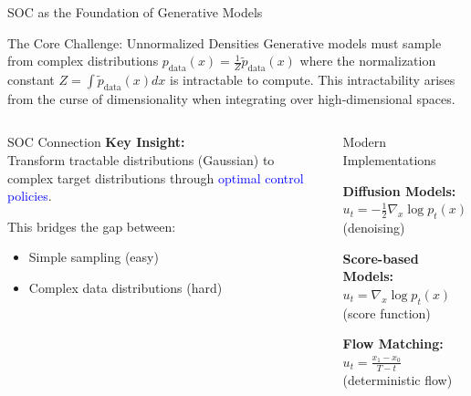 \documentclass[aspectratio=169,xcolor=dvipsnames]{beamer}
\begin{document}
\begin{frame}{SOC as the Foundation of Generative Models}
    \vspace{-0.3cm}
    \begin{block}{The Core Challenge: Unnormalized Densities}
        Generative models must sample from complex distributions $p_{\text{data}}(x) = \frac{1}{Z} \tilde{p}_{\text{data}}(x)$ where the normalization constant $Z = \int \tilde{p}_{\text{data}}(x) dx$ is intractable to compute. This intractability arises from the curse of dimensionality when integrating over high-dimensional spaces.
    \end{block}

    \vspace{-0.3cm}

    \begin{columns}[t]
        \begin{alertblock}{SOC Connection}
            \small
            \textbf{Key Insight:} \\
            Transform tractable distributions (Gaussian) to complex target distributions through \textcolor{blue}{optimal control policies}.
            
            \vspace{0.3cm}
            
            This bridges the gap between:
            \begin{itemize}
                \item Simple sampling (easy)
                \item Complex data distributions (hard)
            \end{itemize}
        \end{alertblock}
        
        \begin{block}{Modern Implementations}
            \small
            
            \textbf{Diffusion Models:} \\
            $u_t = -\frac{1}{2}\nabla_x \log p_t(x)$ (denoising)
            
            \vspace{0.2cm}
            \textbf{Score-based Models:} \\
            $u_t = \nabla_x \log p_t(x)$ (score function)
            
            \vspace{0.2cm}
            \textbf{Flow Matching:} \\
            $u_t = \frac{x_1 - x_0}{T-t}$ (deterministic flow)
            

\end{block}
\end{columns}
\end{frame}
\end{document}
